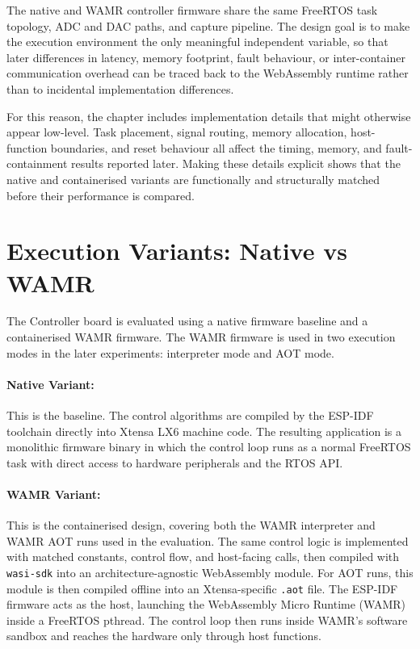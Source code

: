 \documentclass[12pt, a4paper]{report}
\begin{document}
The native and WAMR controller firmware share the same FreeRTOS task topology, ADC and DAC paths, and capture pipeline. The design goal is to make the execution environment the only meaningful independent variable, so that later differences in latency, memory footprint, fault behaviour, or inter-container communication overhead can be traced back to the WebAssembly runtime rather than to incidental implementation differences.

For this reason, the chapter includes implementation details that might otherwise appear low-level. Task placement, signal routing, memory allocation, host-function boundaries, and reset behaviour all affect the timing, memory, and fault-containment results reported later. Making these details explicit shows that the native and containerised variants are functionally and structurally matched before their performance is compared.


\section{Execution Variants: Native vs WAMR}
\label{sec:variants}

The Controller board is evaluated using a native firmware baseline and a containerised WAMR firmware. The WAMR firmware is used in two execution modes in the later experiments: interpreter mode and AOT mode.

\paragraph{Native Variant:} This is the baseline. The control algorithms are compiled by the ESP-IDF toolchain directly into Xtensa LX6 machine code. The resulting application is a monolithic firmware binary in which the control loop runs as a normal FreeRTOS task with direct access to hardware peripherals and the RTOS API.

\paragraph{WAMR Variant:} This is the containerised design, covering both the WAMR interpreter and WAMR AOT runs used in the evaluation. The same control logic is implemented with matched constants, control flow, and host-facing calls, then compiled with \texttt{wasi-sdk} into an architecture-agnostic WebAssembly module. For AOT runs, this module is then compiled offline into an Xtensa-specific \texttt{.aot} file. The ESP-IDF firmware acts as the host, launching the WebAssembly Micro Runtime (WAMR) inside a FreeRTOS pthread. The control loop then runs inside WAMR's software sandbox and reaches the hardware only through host functions.
\end{document}
